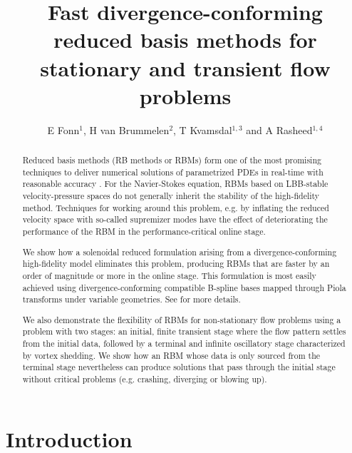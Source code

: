 \documentclass[a4paper]{jpconf}
\begin{document}
\title{
  Fast divergence-conforming reduced basis methods for stationary
  and transient flow problems
}

\author{
  E Fonn$^{1}$,
  H van Brummelen$^{2}$,
  T Kvamsdal$^{1,3}$ and
  A Rasheed$^{1,4}$
}
\address{
  $^{1}$ Department of Applied Mathematics and Cybernetics, SINTEF Digital \\
  $^{2}$ Department of Mechanical Engineering, Eindhoven University of Technology \\
  $^{3}$ Department of Mathematical Sciences, Norwegian University of Science and Technology \\
  $^{4}$ Department of Engineering Cybernetics, Norwegian University of Science and Technology
}

\begin{abstract}
  Reduced basis methods (RB methods or RBMs) form one of the most
  promising techniques to deliver numerical solutions of parametrized
  PDEs in real-time with reasonable accuracy \cite{Quarteroni2016rbm}.
  For the Navier-Stokes equation, RBMs based on LBB-stable
  velocity-pressure spaces do not generally inherit the stability of
  the high-fidelity method. Techniques for working around this
  problem, e.g. by inflating the reduced velocity space with so-called
  supremizer modes \cite{Ballarin2015ssp} have the effect of
  deteriorating the performance of the RBM in the performance-critical
  online stage.

  We show how a solenoidal reduced formulation arising from a
  divergence-conforming high-fidelity model eliminates this problem,
  producing RBMs that are faster by an order of magnitude or more in
  the online stage. This formulation is most easily achieved using
  divergence-conforming compatible B-spline bases mapped through Piola
  transforms under variable geometries. See \cite{Fonn2018fdc} for
  more details.

  We also demonstrate the flexibility of RBMs for non-stationary flow
  problems using a problem with two stages: an initial, finite
  transient stage where the flow pattern settles from the initial
  data, followed by a terminal and infinite oscillatory stage
  characterized by vortex shedding. We show how an RBM whose data is
  only sourced from the terminal stage nevertheless can produce
  solutions that pass through the initial stage without critical
  problems (e.g. crashing, diverging or blowing up).
\end{abstract}

\section{Introduction}
\end{document}
